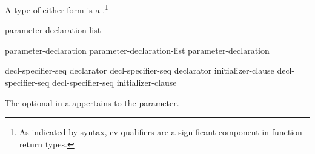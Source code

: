 \pnum
{}%
A type of either form is a .\footnote{As indicated by syntax, cv-qualifiers are a significant component in function return types.}

%
\begin{bnf}
\br
     \br
    parameter-declaration-list \terminal{,} 
\end{bnf}

\begin{bnf}
\br
    parameter-declaration\br
    parameter-declaration-list \terminal{,} parameter-declaration
\end{bnf}

\begin{bnf}
\br
     decl-specifier-seq declarator\br
     decl-specifier-seq declarator \terminal{=} initializer-clause\br
     decl-specifier-seq \br
     decl-specifier-seq  \terminal{=} initializer-clause
\end{bnf}

The optional  in a 
appertains to the parameter.

